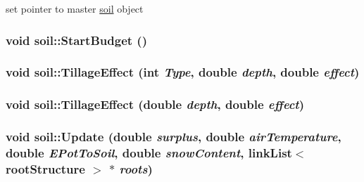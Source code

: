 set pointer to master \hyperlink{classsoil}{soil} object \hypertarget{classsoil_a12a12882c22a4462895f9df500a9e77d}{
\subsubsection[{StartBudget}]{\setlength{\rightskip}{0pt plus 5cm}void soil::StartBudget ()}}
\label{classsoil_a12a12882c22a4462895f9df500a9e77d}
\hypertarget{classsoil_a8c61b5403df7abbb44b6a369a509a69a}{
\subsubsection[{TillageEffect}]{\setlength{\rightskip}{0pt plus 5cm}void soil::TillageEffect (int {\em Type}, \/  double {\em depth}, \/  double {\em effect})}}
\label{classsoil_a8c61b5403df7abbb44b6a369a509a69a}
\hypertarget{classsoil_aac4bfa4c24d75121fa85d5a133664ee6}{
\subsubsection[{TillageEffect}]{\setlength{\rightskip}{0pt plus 5cm}void soil::TillageEffect (double {\em depth}, \/  double {\em effect})}}
\label{classsoil_aac4bfa4c24d75121fa85d5a133664ee6}
\hypertarget{classsoil_a79a9daafbc7c61b4a5392ac22f36ed5e}{
\subsubsection[{Update}]{\setlength{\rightskip}{0pt plus 5cm}void soil::Update (double {\em surplus}, \/  double {\em airTemperature}, \/  double {\em EPotToSoil}, \/  double {\em snowContent}, \/  {\bf linkList}$<$ {\bf rootStructure} $>$ $\ast$ {\em roots})}}
\label{classsoil_a79a9daafbc7c61b4a5392ac22f36ed5e}


